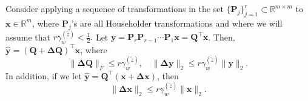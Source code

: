 \documentclass[review,onefignum,onetabnum]{siamart190516}
\newcommand{\R}{\mathbb{R}}
\newcommand{\bb}[1]{\mathbf{#1}}
\begin{document}

\begin{lemma}
	\label{lem:19.3}
	Consider applying a sequence of transformations in the set $\{\bb{P}_j\}_{j=1}^r\subset\R^{m\times m}$ to $\bb{x}\in\R^m$, where $\bb{P}_j$'s are all Householder transformations and where we will assume that $r\gamma_w^{(\tilde{z})}<\frac{1}{2}.$ 
	Let $\bb{y} = \bb{P}_r\bb{P}_{r-1}\cdots\bb{P}_1\bb{x} = \bb{Q}^{\top}\bb{x}$.
	Then, $\hat{\bb{y}} = (\bb{Q}+\bb{\Delta Q})^{\top}\bb{x}$, where 
	\begin{equation}
	\|\bb{\Delta Q}\|_F \leq r\gamma_w^{(\tilde{z})},\quad  \|\bb{\Delta y}\|_2 \leq r \gamma_w^{(\tilde{z})} \|\bb{y}\|_2.\label{eqn:19.3}
	\end{equation}
	In addition, if we let $\hat{\bb{y}} =\bb{Q}^{\top}(\bb{x} + \bb{\Delta x})$, then 
	\begin{equation}
	\|\bb{\Delta x}\|_2 \leq r \gamma_w^{(\tilde{z})} \|\bb{x}\|_2.\label{eqn:19.3c}
	\end{equation}
\end{lemma}
\end{document}
